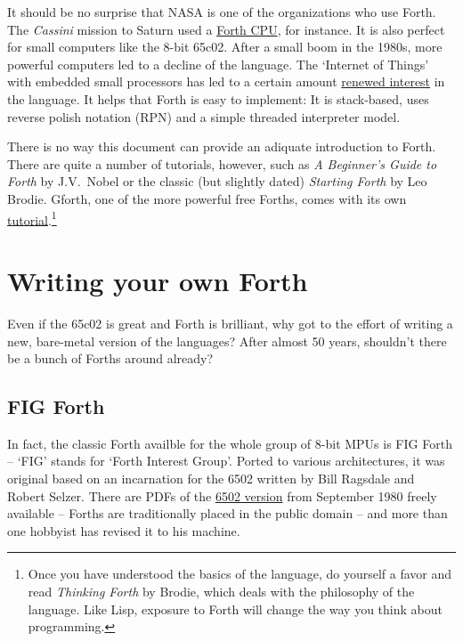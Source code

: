 It should be no surprise that NASA is one of the organizations who
use Forth. The \textit{Cassini} mission to
Saturn used a
\href{http://www.cpushack.com/2013/02/21/charles-moore-forth-stack-processors/}{Forth
CPU}, for instance. It is also perfect for small computers like the 8-bit 65c02.
After a small boom in the 1980s, more powerful computers led to a decline of the
language. The `Internet of Things' with embedded small processors has led to a
certain amount
\href{https://www.embedded.com/design/programming-languages-and-tools/4431133/Go-Forth-}{renewed
interest} in the language. It helps that Forth is easy to implement: It is
stack-based, uses reverse polish notation (RPN) and a simple threaded
interpreter model. 

There is no way this document can provide an adiquate introduction to Forth.
There are quite a number of tutorials, however, such as \textit{A Beginner's
Guide to Forth} by J.V.~Nobel\cite{nobel} or the classic (but slightly dated)
\textit{Starting Forth}\cite{brodie03} by Leo Brodie.
Gforth, one of the more powerful free Forths, comes with its own
\href{http://www.complang.tuwien.ac.at/forth/gforth/Docs-html/Tutorial.html}{tutorial}.\footnote{Once
you have understood the basics of the language, do yourself a favor and read
\textit{Thinking Forth} by Brodie\cite{brodie84}, which deals
with the philosophy of the language. Like Lisp, exposure to Forth
will change the way you think about programming.} 


\section{Writing your own Forth}

Even if the 65c02 is great and Forth is brilliant, why got to the effort of
writing a new, bare-metal version of the languages? After almost 50 years,
shouldn't there be a bunch of Forths around already?


\subsection{FIG Forth}

In fact, the classic Forth availble for the whole group of 8-bit MPUs is FIG
Forth -- `FIG' stands for `Forth Interest Group'. Ported to
various architectures, it was original based on an incarnation for the 6502
written by Bill Ragsdale and Robert Selzer. There are PDFs of the
\href{http://www.forth.org/fig-forth/fig-forth\_6502.pdf}{6502 version} from
September 1980 freely available -- Forths are traditionally placed in the public
domain -- and more than one hobbyist has revised it to his machine. 

